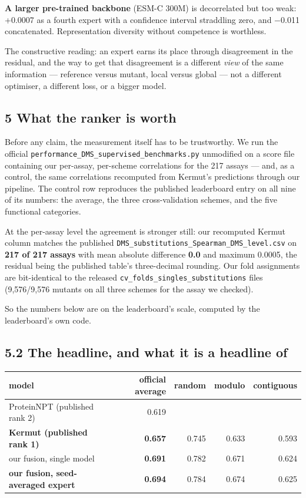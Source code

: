 \textbf{A larger pre-trained backbone} (ESM-C 300M) is decorrelated but too weak: +0.0007 as a fourth expert
with a confidence interval straddling zero, and −0.011 concatenated. Representation diversity without
competence is worthless.

The constructive reading: an expert earns its place through disagreement in the residual, and the way
to get that disagreement is a different \emph{view} of the same information --- reference versus mutant, local
versus global --- not a different optimiser, a different loss, or a bigger model.

\hypertarget{what-the-ranker-is-worth}{%
\subsection{5 What the ranker is worth}\label{what-the-ranker-is-worth}}

Before any claim, the measurement itself has to be trustworthy. We run the official
\texttt{performance\_DMS\_supervised\_benchmarks.py} unmodified on a score file containing our per-assay,
per-scheme correlations for the 217 assays --- and, as a control, the same correlations recomputed from
Kermut's predictions through our pipeline. The control row reproduces the published leaderboard entry on
all nine of its numbers: the average, the three cross-validation schemes, and the five functional
categories.

At the per-assay level the agreement is stronger still: our recomputed Kermut column matches the
published \texttt{DMS\_substitutions\_Spearman\_DMS\_level.csv} on \textbf{217 of 217 assays} with mean absolute
difference \textbf{0.0} and maximum 0.0005, the residual being the published table's three-decimal rounding.
Our fold assignments are bit-identical to the released \texttt{cv\_folds\_singles\_substitutions} files
(9,576/9,576 mutants on all three schemes for the assay we checked).

So the numbers below are on the leaderboard's scale, computed by the leaderboard's own code.

\hypertarget{the-headline-and-what-it-is-a-headline-of}{%
\subsection{5.2 The headline, and what it is a headline of}\label{the-headline-and-what-it-is-a-headline-of}}

\begin{longtable}[]{@{}lrrrr@{}}
\toprule
model & official average & random & modulo & contiguous \\
\midrule
\endhead
ProteinNPT (published rank 2) & 0.619 & & & \\
\textbf{Kermut (published rank 1)} & \textbf{0.657} & 0.745 & 0.633 & 0.593 \\
our fusion, single model & \textbf{0.691} & 0.782 & 0.671 & 0.624 \\
\textbf{our fusion, seed-averaged expert} & \textbf{0.694} & 0.784 & 0.674 & 0.625 \\
\bottomrule
\end{longtable}

